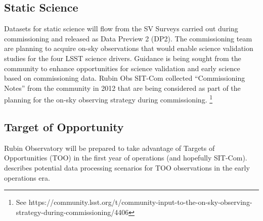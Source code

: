 \subsection{Static Science}

Datasets for static science will flow from the SV Surveys carried out during commissioning and released as Data Preview 2 (DP2).
The commissioning team are planning to acquire on-sky observations that would enable science validation studies for the four LSST science drivers.
Guidance is being sought from the community to enhance opportunities for science validation and early science  based on commissioning data.
Rubin Obs SIT-Com collected ``Commissioning Notes'' from the community in 2012 that are being considered as part of the
planning for the on-sky observing strategy during commissioning. \footnote {See https://community.lsst.org/t/community-input-to-the-on-sky-observing-strategy-during-commissioning/4406}


\subsection{Target of Opportunity}

Rubin Observatory will be prepared to take advantage of Targets of Opportunities (TOO) in the first year of operations (and hopefully SIT-Com).
 describes potential data processing scenarios for TOO observations in the early operations era.
